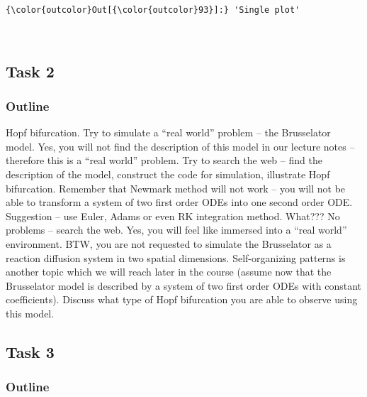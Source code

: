 \documentclass[11pt]{article}
\begin{document}
\begin{Verbatim}[commandchars=\\\{\}]
{\color{outcolor}Out[{\color{outcolor}93}]:} 'Single plot'
\end{Verbatim}
            
    \begin{center}
    \end{center}
    { \hspace*{\fill} \\}
    
    \hypertarget{task-2}{%
\subsection{Task 2}\label{task-2}}

\hypertarget{outline}{%
\subsubsection{Outline}\label{outline}}

Hopf bifurcation. Try to simulate a ``real world'' problem -- the
Brusselator model. Yes, you will not find the description of this model
in our lecture notes -- therefore this is a ``real world'' problem. Try
to search the web -- find the description of the model, construct the
code for simulation, illustrate Hopf bifurcation. Remember that Newmark
method will not work -- you will not be able to transform a system of
two first order ODEs into one second order ODE. Suggestion -- use Euler,
Adams or even RK integration method. What??? No problems -- search the
web. Yes, you will feel like immersed into a ``real world'' environment.
BTW, you are not requested to simulate the Brusselator as a reaction
diffusion system in two spatial dimensions. Self-organizing patterns is
another topic which we will reach later in the course (assume now that
the Brusselator model is described by a system of two first order ODEs
with constant coefficients). Discuss what type of Hopf bifurcation you
are able to observe using this model.

    \hypertarget{task-3}{%
\subsection{Task 3}\label{task-3}}

\hypertarget{outline}{%
\subsubsection{Outline}\label{outline}}
\end{document}
